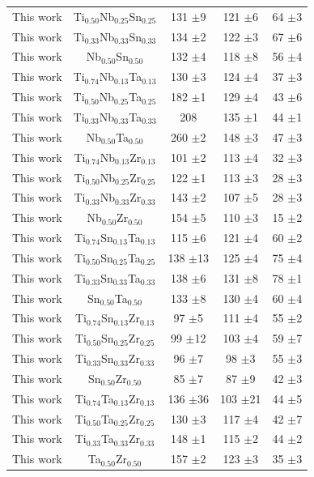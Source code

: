 \begin{longtable}[H]{ c c c c c}
	This work & Ti$_{0.50}$Nb$_{0.25}$Sn$_{0.25}$ & 131 $\pm$9 & 121 $\pm$6 & 64 $\pm$3 \\
	This work & Ti$_{0.33}$Nb$_{0.33}$Sn$_{0.33}$ & 134 $\pm$2 & 122 $\pm$3 & 67 $\pm$6 \\
	This work & Nb$_{0.50}$Sn$_{0.50}$ & 132 $\pm$4 & 118 $\pm$8 & 56 $\pm$4 \\
	This work & Ti$_{0.74}$Nb$_{0.13}$Ta$_{0.13}$ & 130 $\pm$3 & 124 $\pm$4 & 37 $\pm$3 \\
	This work & Ti$_{0.50}$Nb$_{0.25}$Ta$_{0.25}$ & 182 $\pm$1 & 129 $\pm$4 & 43 $\pm$6 \\
	This work & Ti$_{0.33}$Nb$_{0.33}$Ta$_{0.33}$ & 208 & 135 $\pm$1 & 44 $\pm$1 \\
	This work & Nb$_{0.50}$Ta$_{0.50}$ & 260 $\pm$2 & 148 $\pm$3 & 47 $\pm$3 \\
	This work & Ti$_{0.74}$Nb$_{0.13}$Zr$_{0.13}$ & 101 $\pm$2 & 113 $\pm$4 & 32 $\pm$3\\
	This work & Ti$_{0.50}$Nb$_{0.25}$Zr$_{0.25}$ & 122 $\pm$1 & 113 $\pm$3 & 28 $\pm$3 \\
	This work & Ti$_{0.33}$Nb$_{0.33}$Zr$_{0.33}$ & 143 $\pm$2 & 107 $\pm$5 & 28 $\pm$3 \\
	This work & Nb$_{0.50}$Zr$_{0.50}$ & 154 $\pm$5 & 110 $\pm$3 & 15 $\pm$2 \\
	This work & Ti$_{0.74}$Sn$_{0.13}$Ta$_{0.13}$ & 115 $\pm$6 & 121 $\pm$4 & 60 $\pm$2 \\
	This work & Ti$_{0.50}$Sn$_{0.25}$Ta$_{0.25}$ & 138 $\pm$13 & 125 $\pm$4 & 75 $\pm$4 \\
	This work & Ti$_{0.33}$Sn$_{0.33}$Ta$_{0.33}$ & 138 $\pm$6 & 131 $\pm$8 & 78 $\pm$1 \\
	This work & Sn$_{0.50}$Ta$_{0.50}$ & 133 $\pm$8 & 130 $\pm$4 & 60 $\pm$4 \\
	This work & Ti$_{0.74}$Sn$_{0.13}$Zr$_{0.13}$ & 97 $\pm$5 & 111 $\pm$4 & 55 $\pm$2 \\
	This work & Ti$_{0.50}$Sn$_{0.25}$Zr$_{0.25}$ & 99 $\pm$12 & 103 $\pm$4 & 59 $\pm$7 \\
	This work & Ti$_{0.33}$Sn$_{0.33}$Zr$_{0.33}$ & 96 $\pm$7 & 98 $\pm$3 & 55 $\pm$3 \\
	This work & Sn$_{0.50}$Zr$_{0.50}$ & 85 $\pm$7 & 87 $\pm$9 & 42 $\pm$3 \\
	This work & Ti$_{0.74}$Ta$_{0.13}$Zr$_{0.13}$ & 136 $\pm$36 & 103 $\pm$21 & 44 $\pm$5 \\
	This work & Ti$_{0.50}$Ta$_{0.25}$Zr$_{0.25}$ & 130 $\pm$3 & 117 $\pm$4 & 42 $\pm$7 \\
	This work & Ti$_{0.33}$Ta$_{0.33}$Zr$_{0.33}$ & 148 $\pm$1 & 115 $\pm$2 & 44 $\pm$2 \\
	This work & Ta$_{0.50}$Zr$_{0.50}$ & 157 $\pm$2 & 123 $\pm$3 & 35 $\pm$3 \\
\end{longtable}

